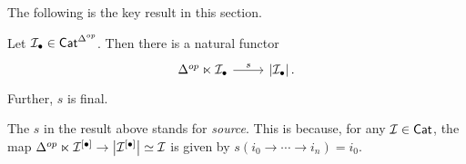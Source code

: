 \documentclass[a4paper,10pt]{article}%
\begin{document}
The following is the key result in this section.

\begin{proposition}\label{SOURCEFINAL PROP}
  Let $\mathcal{I}_{\bullet} \in \mathsf{Cat}^{\Delta^{op}}$.
  Then there is a natural functor
  \begin{equation}
    \begin{tikzcd}
      \Delta^{op} \ltimes \mcI_{\bullet}
      \ar{r}{s} &
      \left| \mcI_{\bullet} \right|.
    \end{tikzcd}
  \end{equation}
  Further, $s$ is final.
\end{proposition}

\begin{remark}
  The $s$ in the result above stands for \textit{source}. 
  This is because, for any $\mathcal{I} \in \mathsf{Cat}$, the map
  $\Delta^{op} \ltimes \mathcal{I}^{[\bullet]}
  \to \left| \mathcal{I}^{[\bullet]} \right|
  \simeq \mathcal{I}$ is given by $s(i_0\to \cdots \to i_n) = i_0$.
\end{remark}
\end{document}
